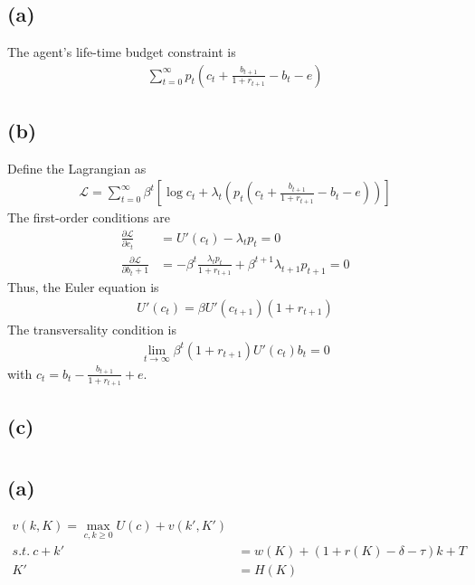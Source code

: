 \documentclass{ltjsarticle}
\begin{document}
\section{} %

\subsection*{(a)}
The agent's life-time budget constraint is
\begin{gather*}
    \sum_{t=0}^\infty p_t \left(c_t + \frac{b_{t+1}}{1+r_{t+1}} - b_t - e \right)
\end{gather*}

\subsection*{(b)}
Define the Lagrangian as
\begin{gather*}
    \mathcal{L} = \sum_{t=0}^\infty \beta^t \left[ \log c_t + \lambda_t \left( p_t \left(c_t + \frac{b_{t+1}}{1+r_{t+1}} - b_t - e \right) \right) \right] 
\end{gather*}
The first-order conditions are
\begin{align*}
    \frac{\partial \mathcal{L}}{\partial c_t} &= U'(c_t) - \lambda_t p_t = 0 \\
    \frac{\partial \mathcal{L}}{\partial b_t+1} &= - \beta^t \frac{\lambda_t p_t}{1+r_{t+1}} + \beta^{t+1} \lambda_{t+1} p_{t+1} = 0
\end{align*}
Thus, the Euler equation is
\begin{gather*}
    U'(c_t) = \beta U'(c_{t+1})(1+r_{t+1})
\end{gather*}
The transversality condition is
\begin{gather*}
    \lim_{t \to \infty} \beta^t (1+r_{t+1}) U'(c_t) b_t = 0
\end{gather*}
with $c_t = b_t - \frac{b_{t+1}}{1 + r_{t+1}} + e$.

\subsection*{(c)}


\section{} %
\subsection*{(a)}
\begin{align*}
    v(k,K)= \max_{c,k\geq 0} U(c) + v(k', K')\\
    s.t.\ c+k' &= w(K) + (1+r(K)-\delta -\tau)k + T\\
    K' &= H(K)
\end{align*}
\end{document}
